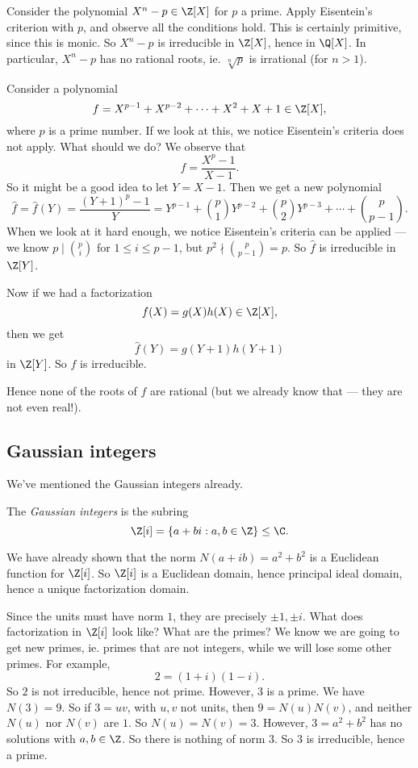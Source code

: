 \documentclass[a4paper]{article}
\begin{document}
\begin{eg}
  Consider the polynomial $X^n - p \in \Z[X]$ for $p$ a prime. Apply Eisentein's criterion with $p$, and observe all the conditions hold. This is certainly primitive, since this is monic. So $X^n - p$ is irreducible in $\Z[X]$, hence in $\Q[X]$. In particular, $X^n - p$ has no rational roots, ie. $\sqrt[n]{p}$ is irrational (for $n > 1$).
\end{eg}

\begin{eg}
  Consider a polynomial
  \[
    f = X^{p - 1} + X^{p - 2} + \cdots + X^2 + X + 1 \in \Z[X],
  \]
  where $p$ is a prime number. If we look at this, we notice Eisentein's criteria does not apply. What should we do? We observe that
  \[
    f = \frac{X^p - 1}{X - 1}.
  \]
  So it might be a good idea to let $Y = X - 1$. Then we get a new polynomial
  \[
    \hat{f} = \hat{f}(Y) = \frac{(Y + 1)^p - 1}{Y} = Y^{p - 1} + \binom{p}{1} Y^{p - 2} + \binom{p}{2} Y^{p - 3} + \cdots + \binom{p}{p - 1}.
  \]
  When we look at it hard enough, we notice Eisentein's criteria can be applied --- we know $p \mid \binom{p}{i}$ for $1 \leq i \leq p - 1$, but $p^2 \nmid \binom{p}{p - 1} = p$. So $\hat{f}$ is irreducible in $\Z[Y]$.

  Now if we had a factorization
  \[
    f(X) = g(X)h(X) \in \Z[X],
  \]
  then we get
  \[
    \hat{f}(Y) = g(Y + 1)h(Y + 1)
  \]
  in $\Z[Y]$. So $f$ is irreducible.

  Hence none of the roots of $f$ are rational (but we already know that --- they are not even real!).
\end{eg}

\subsection{Gaussian integers}
We've mentioned the Gaussian integers already.
\begin{defi}
  The \emph{Gaussian integers} is the subring
  \[
    \Z[i] = \{a + bi: a, b\in \Z\} \leq \C.
  \]
\end{defi}

We have already shown that the norm $N(a + ib) = a^2 + b^2$ is a Euclidean function for $\Z[i]$. So $\Z[i]$ is a Euclidean domain, hence principal ideal domain, hence a unique factorization domain.

Since the units must have norm $1$, they are precisely $\pm 1, \pm i$. What does factorization in $\Z[i]$ look like? What are the primes? We know we are going to get new primes, ie. primes that are not integers, while we will lose some other primes. For example,
\[
  2 = (1 + i)(1 - i).
\]
So $2$ is not irreducible, hence not prime. However, $3$ is a prime. We have $N(3) = 9$. So if $3 = uv$, with $u, v$ not units, then $9 = N(u)N(v)$, and neither $N(u)$ nor $N(v)$ are $1$. So $N(u) = N(v) = 3$. However, $3 = a^2 + b^2$ has no solutions with $a, b \in \Z$. So there is nothing of norm $3$. So $3$ is irreducible, hence a prime.
\end{document}
